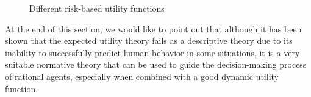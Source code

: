 \begin{figure}[H]
\begin{minipage}{.3\textwidth}
    \end{minipage}
    \hspace{1em}
    \begin{minipage}{.3\textwidth}
      \centering
    \end{minipage}
    \caption{Different risk-based utility functions}
    \label{fig:risk-based-utility}
\end{figure}

At the end of this section, we would like to point out that although it has been shown \cite{kahneman2013prospect} that the expected utility theory fails as a descriptive theory due to its inability to successfully predict human behavior in some situations, it is a very suitable normative theory that can be used to guide the decision-making process of rational agents, especially when combined with a good dynamic utility function.

